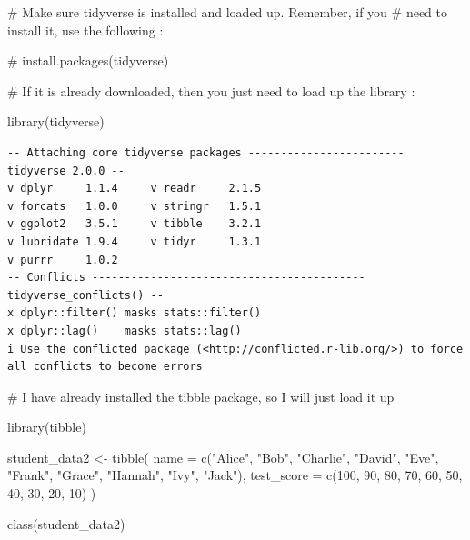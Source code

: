 \documentclass[
  letterpaper,
  DIV=11,
  numbers=noendperiod]{scrreprt}
\newenvironment{Shaded}{\begin{snugshade}}{\end{snugshade}}
\newcommand{\AttributeTok}[1]{\textcolor[rgb]{0.40,0.45,0.13}{#1}}
\newcommand{\CommentTok}[1]{\textcolor[rgb]{0.37,0.37,0.37}{#1}}
\newcommand{\DecValTok}[1]{\textcolor[rgb]{0.68,0.00,0.00}{#1}}
\newcommand{\FunctionTok}[1]{\textcolor[rgb]{0.28,0.35,0.67}{#1}}
\newcommand{\NormalTok}[1]{\textcolor[rgb]{0.00,0.23,0.31}{#1}}
\newcommand{\OtherTok}[1]{\textcolor[rgb]{0.00,0.23,0.31}{#1}}
\newcommand{\StringTok}[1]{\textcolor[rgb]{0.13,0.47,0.30}{#1}}
\begin{document}
\begin{Shaded}
\begin{Highlighting}[]
\CommentTok{\# Make sure tidyverse is installed and loaded up. Remember, if you}
\CommentTok{\# need to install it, use the following :}

\CommentTok{\# install.packages(tidyverse)}
\end{Highlighting}
\end{Shaded}

\begin{Shaded}
\begin{Highlighting}[]
\CommentTok{\# If it is already downloaded, then you just need to load up the library :}

\FunctionTok{library}\NormalTok{(tidyverse)}
\end{Highlighting}
\end{Shaded}

\begin{verbatim}
-- Attaching core tidyverse packages ------------------------ tidyverse 2.0.0 --
v dplyr     1.1.4     v readr     2.1.5
v forcats   1.0.0     v stringr   1.5.1
v ggplot2   3.5.1     v tibble    3.2.1
v lubridate 1.9.4     v tidyr     1.3.1
v purrr     1.0.2     
-- Conflicts ------------------------------------------ tidyverse_conflicts() --
x dplyr::filter() masks stats::filter()
x dplyr::lag()    masks stats::lag()
i Use the conflicted package (<http://conflicted.r-lib.org/>) to force all conflicts to become errors
\end{verbatim}

\begin{Shaded}
\begin{Highlighting}[]
\CommentTok{\# I have already installed the tibble package, so I will just load it up}

\FunctionTok{library}\NormalTok{(tibble)}

\NormalTok{student\_data2 }\OtherTok{\textless{}{-}} \FunctionTok{tibble}\NormalTok{(}
  \AttributeTok{name =} \FunctionTok{c}\NormalTok{(}\StringTok{"Alice"}\NormalTok{, }\StringTok{"Bob"}\NormalTok{, }\StringTok{"Charlie"}\NormalTok{, }\StringTok{"David"}\NormalTok{, }\StringTok{"Eve"}\NormalTok{, }\StringTok{"Frank"}\NormalTok{, }\StringTok{"Grace"}\NormalTok{, }\StringTok{"Hannah"}\NormalTok{, }\StringTok{"Ivy"}\NormalTok{, }\StringTok{"Jack"}\NormalTok{),}
  \AttributeTok{test\_score =} \FunctionTok{c}\NormalTok{(}\DecValTok{100}\NormalTok{, }\DecValTok{90}\NormalTok{, }\DecValTok{80}\NormalTok{, }\DecValTok{70}\NormalTok{, }\DecValTok{60}\NormalTok{, }\DecValTok{50}\NormalTok{, }\DecValTok{40}\NormalTok{, }\DecValTok{30}\NormalTok{, }\DecValTok{20}\NormalTok{, }\DecValTok{10}\NormalTok{)}
\NormalTok{)}

\FunctionTok{class}\NormalTok{(student\_data2)}
\end{Highlighting}
\end{Shaded}
\end{document}
